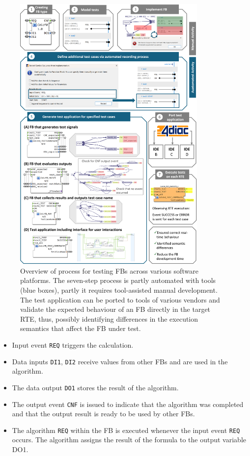 \begin{bibunit}
\begin{figure}[!htbp]
	\centering
	\includegraphics[width=0.85\textwidth]{MX_Papers/Paper10/Figures/methodology_complete.png}
	\caption{Overview of process for testing FBs across various software platforms. The seven-step process is partly automated with tools (blue boxes), partly it requires tool-assisted manual development. The test application can be ported to tools of various vendors and validate the expected behaviour of an FB directly in the target RTE, thus, possibly identifying differences in the execution semantics that affect the FB under test.}
	\label{fig::methodology}
\end{figure}

\begin{itemize}
   \item Input event \texttt{REQ} triggers the calculation.
   \item Data inputs \texttt{DI1}, \texttt{DI2} receive values from other FBs and are used in the algorithm.
   \item The data output \texttt{DO1} stores the result of the algorithm.
   \item The output event \texttt{CNF} is issued to indicate that the algorithm was completed and that the output result is ready to be used by other FBs.
   \item The algorithm \texttt{REQ} within the FB is executed whenever the input event \texttt{REQ} occurs. The algorithm assigns the result of the formula to the output variable DO1.
\end{itemize}


\end{bibunit}
